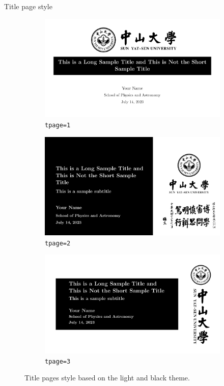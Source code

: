 \documentclass{beamer}
\begin{document}
\begin{frame}[label=tpage]{Title page style}
    \centering
    \begin{figure}
        \centering
        \begin{subfigure}[b]{0.32\textwidth}
            \includegraphics[width=\textwidth]{figure/tpage1.pdf}
            \caption{\texttt{tpage=1}}
        \end{subfigure}
        \begin{subfigure}[b]{0.32\textwidth}
            \includegraphics[width=\textwidth]{figure/tpage2.pdf}
            \caption{\texttt{tpage=2}}
        \end{subfigure}
        \begin{subfigure}[b]{0.32\textwidth}
            \includegraphics[width=\textwidth]{figure/tpage3.pdf}
            \caption{\texttt{tpage=3}}
        \end{subfigure}
        \caption{Title pages style based on the light and black theme.}
    \end{figure}
\end{frame}
\end{document}
